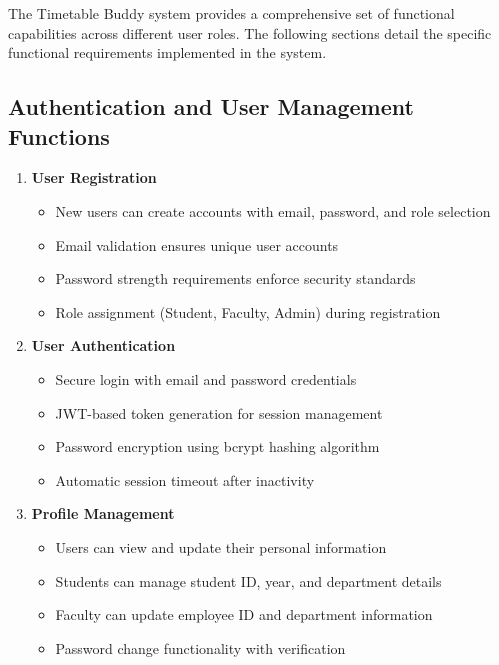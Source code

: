 \documentclass[12pt,a4paper]{report}
\begin{document}
The Timetable Buddy system provides a comprehensive set of functional capabilities across different user roles. The following sections detail the specific functional requirements implemented in the system.

\subsection{Authentication and User Management Functions}

\begin{enumerate}[leftmargin=*]
    \item \textbf{User Registration}
    \begin{itemize}
        \item New users can create accounts with email, password, and role selection
        \item Email validation ensures unique user accounts
        \item Password strength requirements enforce security standards
        \item Role assignment (Student, Faculty, Admin) during registration
    \end{itemize}
    
    \item \textbf{User Authentication}
    \begin{itemize}
        \item Secure login with email and password credentials
        \item JWT-based token generation for session management
        \item Password encryption using bcrypt hashing algorithm
        \item Automatic session timeout after inactivity
    \end{itemize}
    
    \item \textbf{Profile Management}
    \begin{itemize}
        \item Users can view and update their personal information
        \item Students can manage student ID, year, and department details
        \item Faculty can update employee ID and department information
        \item Password change functionality with verification
    \end{itemize}
\end{enumerate}
\end{document}
